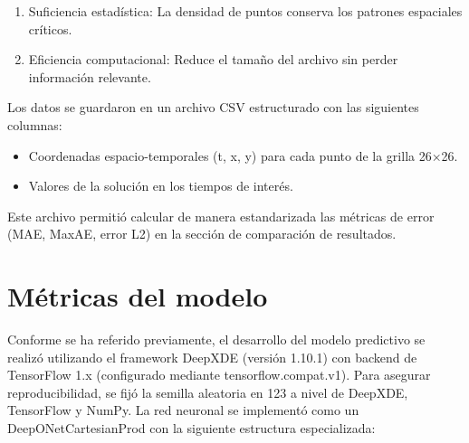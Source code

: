 \documentclass[
  spanish,
  us-letterpaper,
  DIV=11,
  numbers=noendperiod]{scrreprt}
\providecommand{\tightlist}{%
  \setlength{\itemsep}{0pt}\setlength{\parskip}{0pt}}
\theoremstyle{plain}
\theoremstyle{definition}
\theoremstyle{remark}
\begin{document}
\begin{enumerate}
\def\labelenumi{\arabic{enumi}.}
\tightlist
\item
  Suficiencia estadística: La densidad de puntos conserva los patrones
  espaciales críticos.
\item
  Eficiencia computacional: Reduce el tamaño del archivo sin perder
  información relevante.
\end{enumerate}

Los datos se guardaron en un archivo CSV estructurado con las siguientes
columnas:

\begin{itemize}
\tightlist
\item
  Coordenadas espacio-temporales (t, x, y) para cada punto de la grilla
  26×26.
\item
  Valores de la solución en los tiempos de interés.
\end{itemize}

Este archivo permitió calcular de manera estandarizada las métricas de
error (MAE, MaxAE, error L2) en la sección de comparación de resultados.

\chapter{Métricas del modelo}\label{muxe9tricas-del-modelo}

Conforme se ha referido previamente, el desarrollo del modelo predictivo
se realizó utilizando el framework DeepXDE (versión 1.10.1) con backend
de TensorFlow 1.x (configurado mediante tensorflow.compat.v1). Para
asegurar reproducibilidad, se fijó la semilla aleatoria en 123 a nivel
de DeepXDE, TensorFlow y NumPy. La red neuronal se implementó como un
DeepONetCartesianProd con la siguiente estructura especializada:
\end{document}
